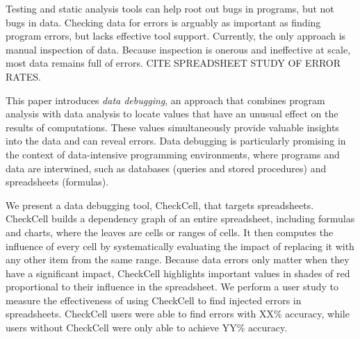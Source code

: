 Testing and static analysis tools can help root out bugs in programs,
but not bugs in data. Checking data for errors is arguably as
important as finding program errors, but lacks
effective tool support. Currently, the only approach is manual
inspection of data. Because inspection is onerous and
ineffective at scale, most data remains full of errors. CITE
SPREADSHEET STUDY OF ERROR RATES.

This paper introduces \emph{data debugging}, an approach that combines
program analysis with data analysis to locate values that have an
unusual effect on the results of computations. These values
simultaneously provide valuable insights into the data and can reveal
errors.  Data debugging is particularly promising in the context of
data-intensive programming environments, where programs and data are
interwined, such as databases (queries and stored procedures) and
spreadsheets (formulas).

We present a data debugging tool, CheckCell, that targets
spreadsheets. CheckCell builds a dependency graph of an entire
spreadsheet, including formulas and charts, where the leaves are cells
or ranges of cells. It then computes the influence of every cell by
systematically evaluating the impact of replacing it with any other
item from the same range. Because data errors only matter when they
have a significant impact, CheckCell highlights important values in
shades of red proportional to their influence in the spreadsheet.  We
perform a user study to measure the effectiveness of using
CheckCell to find injected errors in spreadsheets. CheckCell users
were able to find errors with XX\% accuracy, while users without
CheckCell were only able to achieve YY\% accuracy.
